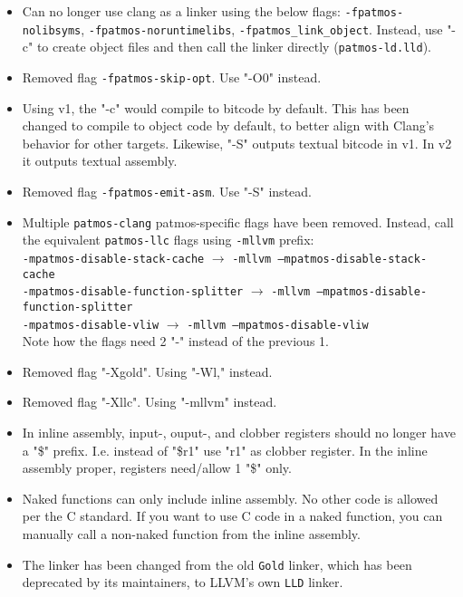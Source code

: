 \begin{itemize}
	\item Can no longer use clang as a linker using the below flags: \texttt{-fpatmos-nolibsyms}, \texttt{-fpatmos-noruntimelibs}, \texttt{-fpatmos\_link\_object}. Instead, use "-c" to create object files and then call the linker directly (\texttt{patmos-ld.lld}).
	
	\item Removed flag \texttt{-fpatmos-skip-opt}. Use "-O0" instead.
	\item Using v1, the "-c" would compile to bitcode by default.
			This has been changed to compile to object code by default, to better align with Clang's behavior for other targets.
			Likewise, "-S" outputs textual bitcode in v1. In v2 it outputs textual assembly.
	\item Removed flag \texttt{-fpatmos-emit-asm}. Use "-S" instead.
	\item Multiple \texttt{patmos-clang} patmos-specific flags have been removed. 
		Instead, call the equivalent \texttt{patmos-llc} flags using \texttt{-mllvm} prefix:\\		
		\texttt{-mpatmos-disable-stack-cache} $\rightarrow$ \texttt{-mllvm --mpatmos-disable-stack-cache}\\
		\texttt{-mpatmos-disable-function-splitter} $\rightarrow$ \texttt{-mllvm --mpatmos-disable-function-splitter}\\
		\texttt{-mpatmos-disable-vliw} $\rightarrow$ \texttt{-mllvm --mpatmos-disable-vliw}\\
		Note how the flags need 2 "-" instead of the previous 1. 
	\item Removed flag "-Xgold". Using "-Wl," instead.
	\item Removed flag "-Xllc". Using "-mllvm" instead.
	\item In inline assembly, input-, ouput-, and clobber registers should no longer have a "\$" prefix.
		I.e. instead of "\$r1" use "r1" as clobber register.
		In the inline assembly proper, registers need/allow 1 "\$" only.
	\item Naked functions can only include inline assembly.
		No other code is allowed per the C standard.
		If you want to use C code in a naked function, you can manually call a non-naked function from the inline assembly.
	\item The linker has been changed from the old \texttt{Gold} linker, which has been deprecated by its maintainers, to LLVM's own \texttt{LLD} linker. 
	
\end{itemize}

